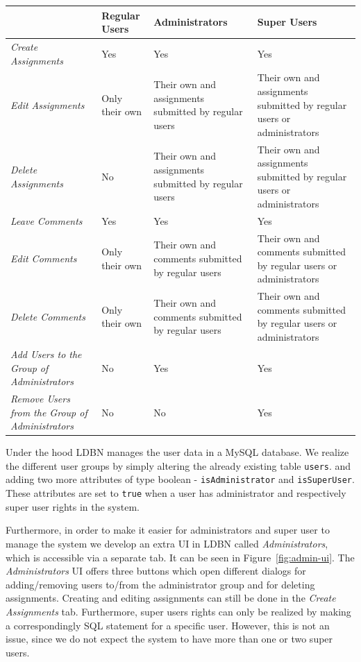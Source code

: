 \begin{center}
\begin{tabular}[h]{| m{2.5cm} || m{2.5cm} | m{3.2cm} | m{3.3cm} |}
\hline
 & \textbf{Regular Users} & \textbf{Administrators} & \textbf{Super Users} \\
\hline
\hline
\emph{Create \mbox{Assignments}} & Yes & Yes & Yes \\
\hline
\emph{Edit \mbox{Assignments}}  & Only their own & Their own and assignments submitted by regular users & Their own and assignments submitted by regular users or administrators \\
\hline
\emph{Delete \mbox{Assignments}} & No & Their own and assignments submitted by regular users & Their own and assignments submitted by regular users or administrators \\
\hline
\emph{Leave \mbox{Comments}}    & Yes & Yes & Yes \\
\hline
\emph{Edit \mbox{Comments}}     & Only their own & Their own and comments submitted by regular users & Their own and comments submitted by regular users or administrators\\
\hline
\emph{Delete \mbox{Comments}}   & Only their own & Their own and comments submitted by regular users & Their own and comments submitted by regular users or administrators \\
\hline
\emph{Add Users to the Group of \mbox{Administrators}} & No & Yes & Yes \\
\hline
\emph{Remove Users from the Group of \mbox{Administrators}} & No & No & Yes \\
\hline
\end{tabular}
\end{center}


Under the hood LDBN manages the user data in a MySQL database. 
We realize the different user groups by simply altering the already existing table \verb=users=. 
and adding two more attributes 
of type boolean - \verb=isAdministrator= and \verb=isSuperUser=. 
These attributes are set to \verb=true= when a user has administrator and respectively super
user rights in the system. 

Furthermore, in order to make it easier for administrators and super user to manage the system
we develop an extra UI in LDBN called \emph{Administrators}, which is accessible via a
separate tab. It can be seen in Figure~\ref{fig:admin-ui}. 
The \emph{Administrators} UI offers three buttons which open 
different dialogs for adding/removing users to/from the administrator group and for
deleting assignments. Creating and editing assignments can still be done in the 
\emph{Create Assignments} tab. Furthermore, super users rights can only be realized by making
a correspondingly SQL statement for a specific user. However, this is not an issue, since 
we do not expect the system to have more than one or two super users. 

